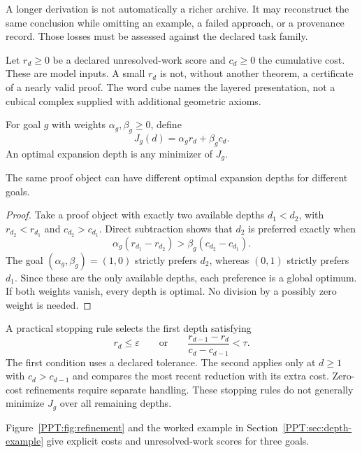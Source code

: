 A longer derivation is not automatically a richer archive. It may reconstruct the same conclusion while omitting an example, a failed approach, or a provenance record. Those losses must be assessed against the declared task family.

Let $r_d\geq0$ be a declared unresolved-work score and $c_d\geq0$ the cumulative cost. These are model inputs. A small $r_d$ is not, without another theorem, a certificate of a nearly valid proof. The word cube names the layered presentation, not a cubical complex supplied with additional geometric axioms.

\begin{PPTdefinition}
\label{PPT:res:19:2}
For goal $g$ with weights $\alpha_g,\beta_g\ge0$, define
\[
J_g(d)=\alpha_g r_d+\beta_g c_d.
\]
An optimal expansion depth is any minimizer of $J_g$.
\end{PPTdefinition}

\begin{PPTtheorem}
\label{PPT:res:19:3}
The same proof object can have different optimal expansion depths for different goals.
\end{PPTtheorem}

\begin{proof}
Take a proof object with exactly two available depths $d_1<d_2$, with $r_{d_2}<r_{d_1}$ and $c_{d_2}>c_{d_1}$. Direct subtraction shows that $d_2$ is preferred exactly when
\[
\alpha_g(r_{d_1}-r_{d_2})>\beta_g(c_{d_2}-c_{d_1}).
\]
The goal $(\alpha_g,\beta_g)=(1,0)$ strictly prefers $d_2$, whereas $(0,1)$ strictly prefers $d_1$. Since these are the only available depths, each preference is a global optimum. If both weights vanish, every depth is optimal. No division by a possibly zero weight is needed.
\end{proof}

A practical stopping rule selects the first depth satisfying
\[
r_d\le\varepsilon\qquad\text{or}\qquad
\frac{r_{d-1}-r_d}{c_d-c_{d-1}}<\tau.
\]
The first condition uses a declared tolerance. The second applies only at $d\geq1$ with $c_d>c_{d-1}$ and compares the most recent reduction with its extra cost. Zero-cost refinements require separate handling. These stopping rules do not generally minimize $J_g$ over all remaining depths.

Figure~\ref{PPT:fig:refinement} and the worked example in Section~\ref{PPT:sec:depth-example} give explicit costs and unresolved-work scores for three goals.

